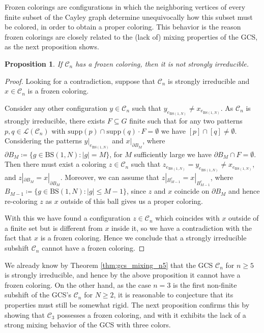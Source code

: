\documentclass{aims}
\newcommand{\BS}[1][N]{\mathrm{BS}(1,#1)}
\newtheorem{proposition}{Proposition}
\theoremstyle{definition}
\begin{document}
Frozen colorings are configurations in which the neighboring vertices of every finite subset of the Cayley graph determine unequivocally how this subset must be colored, in order to obtain a proper coloring. This behavior is the reason frozen colorings are closely related to the (lack of) mixing properties of the GCS, as the next proposition shows.
\begin{proposition} \label{prop:froz_col_not_si} If $\mathcal{C}_n$ has a frozen coloring, then it is not strongly irreducible.
\end{proposition}
\begin{proof}
	
	Looking for a contradiction, suppose that $\mathcal{C}_n$ is strongly irreducible and $x\in \mathcal{C}_n$ is a frozen coloring. 
	
	Consider any other configuration $y\in \mathcal{C}_n$ such that $y_{e_{\BS}}\neq x_{e_{\BS}}$. As $\mathcal{C}_n$ is strongly irreducible, there exists $F\subseteq G$ finite such that for any two patterns $p,q\in \mathcal{L}(\mathcal{C}_n)$ with $\mathrm{supp}(p)\cap \mathrm{supp}(q)\cdot F=\emptyset$ we have $[p]\cap [q]\neq \emptyset$. Considering the patterns $y|_{e_{\BS}}$ and $x|_{\partial B_M}$, where $\partial B_M\coloneqq \{g\in \BS: |g|=M\}$, for $M$ sufficiently large we have $\partial B_M \cap F= \emptyset$. Then there must exist a coloring $z\in \mathcal{C}_n$ such that $z_{e_{\BS}}=y_{e_{\BS}}\neq x_{e_{\BS}}$, and $z|_{\partial B_M}=x|_{\partial B_M}$. Moreover, we can assume that $z|_{B_{M-1}^c}=x|_{B_{M-1}^c}$, where $B_{M-1}\coloneqq \{g\in \BS: |g|\le M-1 \}$, since $z$ and $x$ coincide on $\partial B_M$ and hence re-coloring $z$ as $x$ outside of this ball gives us a proper coloring. 
	
	With this we have found a configuration $z\in \mathcal{C}_n$ which coincides with $x$ outside of a finite set but is different from $x$ inside it, so we have a contradiction with the fact that $x$ is a frozen coloring. Hence we conclude that a strongly irreducible subshift $\mathcal{C}_n$ cannot have a frozen coloring.
\end{proof}
We already know by Theorem \ref{thm:gcs_mixing_n5} that the GCS $\mathcal{C}_n$ for $n\ge 5$ is strongly irreducible, and hence by the above proposition it cannot have a frozen coloring. On the other hand, as the case $n=3$ is the first non-finite subshift of the GCS's $\mathcal{C}_n$ for $N\ge 2$, it is reasonable to conjecture that its properties must still be somewhat rigid. The next proposition confirms this by showing that $\mathcal{C}_3$ possesses a frozen coloring, and with it exhibits the lack of a strong mixing behavior of the GCS with three colors.
\end{document}
